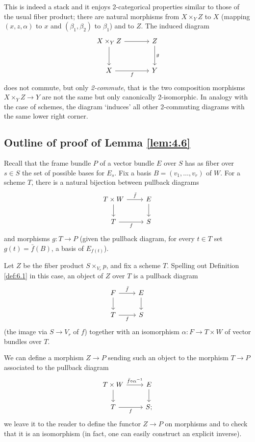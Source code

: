 \documentclass[12pt]{memoir}
\begin{document}

This is indeed a stack and it enjoys 2-categorical properties similar to those of the usual fiber product; there are natural morphisms from $X \times_Y Z$ to $X$ (mapping $(x, z, \alpha)$ to $x$ and $(\beta_1, \beta_2)$ to $\beta_1$) and to $Z$. The induced diagram
$$
\begin{tikzcd}[row sep=large, column sep=large]
X \times_Y Z \arrow[r] \arrow[d] & Z \arrow[d, "g"] \\
X \arrow[r, "f"'] & Y
\end{tikzcd}
$$
does not commute, but only \emph{2-commute}, that is the two composition morphisms $X \times_Y Z \to Y$ are not the same but only canonically 2-isomorphic. In analogy with the case of schemes, the diagram `induces' all other 2-commuting diagrams with the same lower right corner.

\subsection{Outline of proof of Lemma \ref{lem:4.6}}

Recall that the frame bundle $P$ of a vector bundle $E$ over $S$ has as fiber over $s \in S$ the set of possible bases for $E_s$. Fix a basis $B = (v_1, \dots, v_r)$ of $W$. For a scheme $T$, there is a natural bijection between pullback diagrams
$$
\begin{tikzcd}
T \times W \arrow[r, "\bar{f}"] \arrow[d] & E \arrow[d] \\
T \arrow[r, "f"'] & S
\end{tikzcd}
$$
and morphisms $g\colon T \to P$ (given the pullback diagram, for every $t \in T$ set $g(t) = \bar{f}(B)$, a basis of $E_{f(t)}$).

Let $Z$ be the fiber product $S \times_{V_r} p$, and fix a scheme $T$. Spelling out Definition \ref{def:6.1} in this case, an object of $Z$ over $T$ is a pullback diagram
$$
\begin{tikzcd}
F \arrow[r, "\bar{f}"] \arrow[d] & E \arrow[d] \\
T \arrow[r, "f"'] & S
\end{tikzcd}
$$
(the image via $S \to V_r$ of $f$) together with an isomorphism $\alpha\colon F \to T \times W$ of vector bundles over $T$.

We can define a morphism $Z \to P$ sending such an object to the morphism $T \to P$ associated to the pullback diagram
$$
\begin{tikzcd}
T \times W \arrow[r, "\bar{f} \circ \alpha^{-1}"] \arrow[d] & E \arrow[d] \\
T \arrow[r, "f"'] & S;
\end{tikzcd}
$$
we leave it to the reader to define the functor $Z \to P$ on morphisms and to check that it is an isomorphism (in fact, one can easily construct an explicit inverse).
\end{document}
